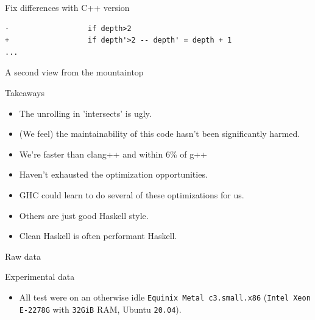 \documentclass[8pt]{beamer}
\begin{document}
\begin{frame}[fragile]{Fix differences with C++ version}
\begin{verbatim}
-                  if depth>2
+                  if depth'>2 -- depth' = depth + 1
...
\end{verbatim}
\end{frame}


\begin{frame}[fragile]{A second view from the mountaintop}
\end{frame}


\begin{frame}[fragile]{Takeaways}
\begin{itemize}
\item The unrolling in 'intersects' is ugly.
\item (We feel) the maintainability of this code hasn’t been significantly harmed.
\item We're faster than clang++ and within 6\% of g++
\item Haven't exhausted the optimization opportunities.
\item GHC could learn to do several of these optimizations for us.
\item Others are just good Haskell style. 
\item Clean Haskell is often performant Haskell.
\end{itemize}

\end{frame}

\begin{frame}[fragile]{Raw data}
\end{frame}

\begin{frame}[fragile]{Experimental data}
\begin{itemize}
\item All test were on an otherwise idle \texttt{Equinix Metal c3.small.x86} (\texttt{Intel Xeon E-2278G} with \texttt{32GiB} RAM, Ubuntu \texttt{20.04}).
\end{itemize}
\end{frame}
\end{document}
